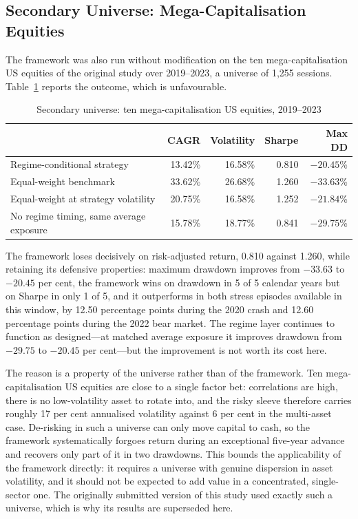 \subsection{Secondary Universe: Mega-Capitalisation Equities}
\label{sec:megacap}

The framework was also run without modification on the ten mega-capitalisation US
equities of the original study over 2019--2023, a universe of 1{,}255 sessions.
Table~\ref{tab:megacap} reports the outcome, which is unfavourable.

\begin{table}[!ht]
\centering
\caption{Secondary universe: ten mega-capitalisation US equities, 2019--2023}
\label{tab:megacap}
\small
\begin{tabular}{p{4.8cm}rrrr}
\hline
& \textbf{CAGR} & \textbf{Volatility} & \textbf{Sharpe} & \textbf{Max DD} \\
\hline
Regime-conditional strategy & 13.42\% & 16.58\% & 0.810 & $-20.45$\% \\
Equal-weight benchmark & 33.62\% & 26.68\% & 1.260 & $-33.63$\% \\
Equal-weight at strategy volatility & 20.75\% & 16.58\% & 1.252 & $-21.84$\% \\
No regime timing, same average exposure & 15.78\% & 18.77\% & 0.841 & $-29.75$\% \\
\hline
\end{tabular}
\end{table}

The framework loses decisively on risk-adjusted return, 0.810 against 1.260, while
retaining its defensive properties: maximum drawdown improves from $-33.63$ to $-20.45$
per cent, the framework wins on drawdown in 5 of 5 calendar years but on Sharpe in only
1 of 5, and it outperforms in both stress episodes available in this window, by 12.50
percentage points during the 2020 crash and 12.60 percentage points during the 2022
bear market.
The regime layer continues to function as designed---at matched average exposure it
improves drawdown from $-29.75$ to $-20.45$ per cent---but the improvement is not worth
its cost here.

The reason is a property of the universe rather than of the framework. Ten
mega-capitalisation US equities are close to a single factor bet: correlations are high,
there is no low-volatility asset to rotate into, and the risky sleeve therefore carries
roughly 17 per cent annualised volatility against 6 per cent in the multi-asset case.
De-risking in such a universe can only move capital to cash, so the framework
systematically forgoes return during an exceptional five-year advance and recovers only
part of it in two drawdowns. This bounds the applicability of the framework directly: it
requires a universe with genuine dispersion in asset volatility, and it should not be
expected to add value in a concentrated, single-sector one. The
originally submitted version of this study used exactly such a universe, which is why
its results are superseded here.
